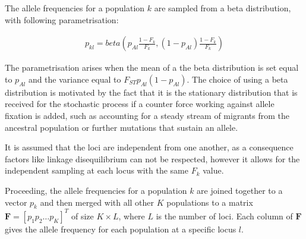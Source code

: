 \documentclass[a4paper, 11pt]{article}
\begin{document}
The allele frequencies for a population $k$ are sampled from a beta distribution, with following parametrisation:

\begin{align}
p_{kl} = beta(p_{Al} \frac{1 - F_k}{F_k}, (1-p_{Al}) \frac{1 - F_k}{F_k})
\end{align}

The parametrisation arises when the mean of a the beta distribution is set equal to $p_{Al}$ and the variance equal to $F_{ST}p_{Al}(1-p_{Al})$.
The choice of using a beta distribution is motivated by the fact that it is the stationary distribution that is received for the stochastic process if a counter force working against allele fixation is added, such as accounting for a steady stream of migrants from the ancestral population or further mutations that sustain an allele.

\parencite{balding2003likelihood}
 
It is assumed that the loci are independent from one another, as a consequence factors like linkage disequilibrium can not be respected, however it allows for the independent sampling at each locus with the same $F_k$ value.

Proceeding, the allele frequencies for a population $k$ are joined together to a vector $p_k$ and then merged with all other $K$ populations to a matrix $\mathbf{F} = [p_1 p_2 \ldots p_K]^T$ of size $K \times L$, where $L$ is the number of loci. Each column of $\mathbf{F}$ gives the allele frequency for each population at a specific locus $l$.\\

\end{document}
